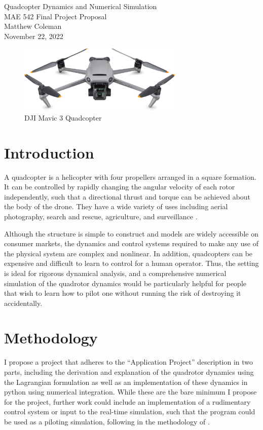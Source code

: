\documentclass{report}
\begin{document}
\begin{center}
    \Large Quadcopter Dynamics and Numerical Simulation \\
    \large MAE 542 Final Project Proposal \\
    \vspace{0.5em}
    \small Matthew Coleman \\
    \small November 22, 2022
\end{center}

\begin{figure}[H]
    \centering
    \includegraphics[width=0.7\textwidth]{proposal/quadcopter.jpg}
    \caption{DJI Mavic 3 Quadcopter}
    \label{fig:quadcopter_image}
\end{figure}

\section{Introduction}

A quadcopter is a helicopter with four propellers arranged in a square formation. It can be controlled by rapidly changing the angular velocity of each rotor independently, such that a directional thrust and torque can be achieved about the body of the drone. They have a wide variety of uses including aerial photography, search and rescue, agriculture, and surveillance \cite{luukkonen2011modelling}.

Although the structure is simple to construct and models are widely accessible on consumer markets, the dynamics and control systems required to make any use of the physical system are complex and nonlinear. In addition, quadcopters can be expensive and difficult to learn to control for a human operator. Thus, the setting is ideal for rigorous dynamical analysis, and a comprehensive numerical simulation of the quadrotor dynamics would be particularly helpful for people that wish to learn how to pilot one without running the risk of destroying it accidentally.

\section{Methodology}

I propose a project that adheres to the ``Application Project'' description in two parts, including the derivation and explanation of the quadrotor dynamics using the Lagrangian formulation as well as an implementation of these dynamics in python using numerical integration. While these are the bare minimum I propose for the project, further work could include an implementation of a rudimentary control system or input to the real-time simulation, such that the program could be used as a piloting simulation, following in the methodology of \cite{murphy2016modular}.


\end{document}
